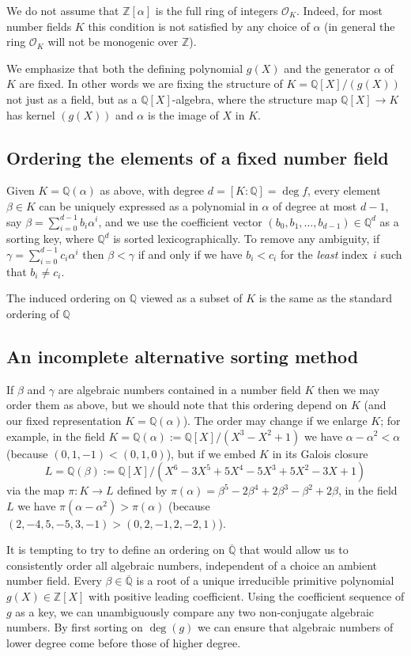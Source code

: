 \documentclass{article}
\def\Z{{\mathbb Z}}
\def\Q{{\mathbb Q}}
\def\OO{{\mathcal O}}
\def\Qbar{\overline{\Q}}
\begin{document}
We do not assume that $\Z[\alpha]$ is the full ring of integers
$\OO_K$.  Indeed, for most number fields $K$ this condition is
not satisfied by any choice of $\alpha$ (in general the ring $\OO_K$
will not be monogenic over $\Z$).

We emphasize that both the defining polynomial $g(X)$ and the generator
$\alpha$ of~$K$ are fixed.  In other words we are fixing the structure
of $K=\Q[X]/(g(X))$ not just as a field, but as a $\Q[X]$-algebra, where the
structure map $\Q[X]\to K$ has kernel $(g(X))$ and $\alpha$ is the
image of $X$ in $K$.

\subsection{Ordering the elements of a fixed number field}\label{sec:ordfix}
Given $K=\Q(\alpha)$ as above, with degree $d=[K:\Q]=\deg f$, every
element $\beta\in K$ can be uniquely expressed as a polynomial in
$\alpha$ of degree at most $d-1$, say
$\beta=\sum_{i=0}^{d-1}b_i\alpha^i$, and we use the coefficient vector
$(b_0,b_1,\dots,b_{d-1})\in\Q^d$ as a sorting key, where $\Q^d$ is
sorted lexicographically.  To remove any ambiguity, if
$\gamma=\sum_{i=0}^{d-1}c_i\alpha^i$ then $\beta<\gamma$ if and only
if we have $b_i<c_i$ for the \textit{least} index~$i$ such that $b_i\not=c_i$.

The induced ordering on $\Q$ viewed as a subset of $K$
is the same as the standard ordering of $\Q$

\subsection{An incomplete alternative sorting method}

If $\beta$ and $\gamma$ are algebraic numbers contained in a number
field $K$ then we may order them as above, but we should note that
this ordering depend on $K$ (and our fixed representation $K=\Q(\alpha)$).
The order may change if we enlarge $K$; for example, in the field
$K=\Q(\alpha):=\Q[X]/(X^3-X^2+1)$ we have $\alpha-\alpha^2 < \alpha$
(because $(0,1,-1) < (0,1,0)$), but if we
embed $K$ in its Galois closure $$L=\Q(\beta):=\Q[X]/(X^6 - 3X^5 + 5X^4 - 5X^3 + 5X^2 - 3X + 1)$$
via the map $\pi:K\to L$ defined by  $\pi(\alpha) = \beta^5 - 2\beta^4 + 2\beta^3 - \beta^2 + 2\beta$,
in the field $L$ we have $\pi(\alpha-\alpha^2) > \pi(\alpha)$
(because $(2,-4,5,-5,3,-1)>(0,2,-1,2,-2,1)$).

It is tempting to try to define an ordering on $\Qbar$ that would
allow us to consistently order all algebraic numbers, independent
of a choice an ambient number field.  Every $\beta\in\Qbar$ is a root of a
unique irreducible primitive polynomial $g(X)\in\Z[X]$  with positive
leading coefficient.  Using the coefficient sequence
of $g$ as a key, we can unambiguously  compare any two non-conjugate algebraic
numbers. By first sorting on $\deg(g)$ we can ensure that algebraic numbers of
lower degree come before those of higher degree.
\end{document}
